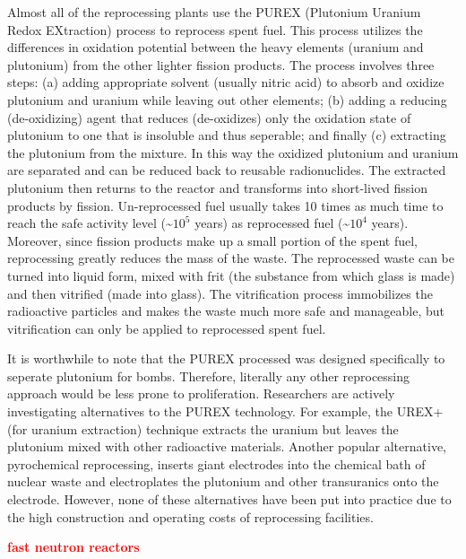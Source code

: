 \documentclass[nofootinbib,preprint,aip,pra]{revtex4-1}
\newcommand{\red}[1]{\textcolor{red}{\bf #1}}
\begin{document}
    Almost all of the reprocessing plants use the PUREX (Plutonium Uranium Redox EXtraction) process
    to reprocess spent fuel. This process utilizes the differences in oxidation potential 
    between the heavy elements (uranium and plutonium) from the other lighter fission products.
    The process involves three steps: (a) adding appropriate solvent (usually nitric acid) to absorb and oxidize 
    plutonium and uranium while leaving out other elements;
    (b) adding a reducing (de-oxidizing) agent that reduces (de-oxidizes) only the
    oxidation state of plutonium to one that is insoluble
    and thus seperable; and finally (c) extracting the plutonium from the mixture. In this way
    the oxidized plutonium and uranium are separated and can be reduced back to reusable radionuclides.\cite{lb01} 
    The extracted plutonium then returns to the reactor and transforms into short-lived fission products
    by fission. Un-reprocessed fuel usually takes 10 times as much time to reach the safe
    activity level (\sim$10^5$ years) as reprocessed fuel (\sim$10^4$ years). Moreover, since fission products
    make up a small portion of the spent fuel, reprocessing greatly reduces the mass of the waste. The reprocessed
    waste can be turned into liquid form, mixed with frit (the substance from which glass is made) and then
    vitrified (made into glass). The vitrification process immobilizes the radioactive particles and makes
    the waste much more safe and manageable, but vitrification can only be applied to reprocessed spent fuel.

    It is worthwhile to note that the PUREX processed was designed specifically to seperate plutonium for
    bombs. Therefore, literally any other reprocessing approach would be less prone to proliferation.
    Researchers are actively investigating alternatives to the PUREX technology. For example, the UREX+ (for
    uranium extraction) technique extracts the uranium but leaves the plutonium mixed with other
    radioactive materials. Another popular alternative, pyrochemical reprocessing, inserts giant electrodes
    into the chemical bath of nuclear waste and electroplates the plutonium and other transuranics onto
    the electrode. However, none of these alternatives have been put into practice due to the high construction
    and operating costs of reprocessing facilities.\cite{aa12}

    \red{fast neutron reactors}
\end{document}
